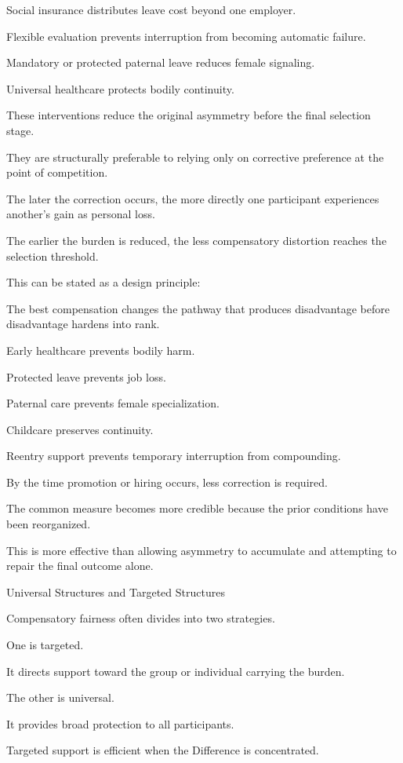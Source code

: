 Social insurance distributes leave cost beyond one employer.

Flexible evaluation prevents interruption from becoming automatic failure.

Mandatory or protected paternal leave reduces female signaling.

Universal healthcare protects bodily continuity.

These interventions reduce the original asymmetry before the final selection stage.

They are structurally preferable to relying only on corrective preference at the point of competition.

The later the correction occurs, the more directly one participant experiences another’s gain as personal loss.

The earlier the burden is reduced, the less compensatory distortion reaches the selection threshold.

This can be stated as a design principle:

The best compensation changes the pathway that produces disadvantage before disadvantage hardens into rank.

Early healthcare prevents bodily harm.

Protected leave prevents job loss.

Paternal care prevents female specialization.

Childcare preserves continuity.

Reentry support prevents temporary interruption from compounding.

By the time promotion or hiring occurs, less correction is required.

The common measure becomes more credible because the prior conditions have been reorganized.

This is more effective than allowing asymmetry to accumulate and attempting to repair the final outcome alone.

Universal Structures and Targeted Structures

Compensatory fairness often divides into two strategies.

One is targeted.

It directs support toward the group or individual carrying the burden.

The other is universal.

It provides broad protection to all participants.

Targeted support is efficient when the Difference is concentrated.

